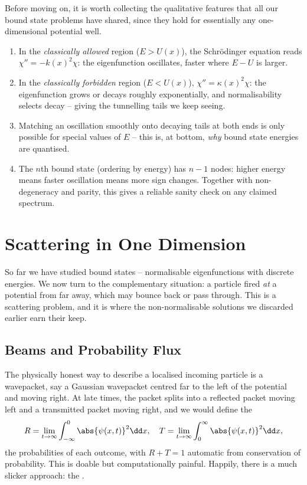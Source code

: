 Before moving on, it is worth collecting the qualitative features that all our bound state problems have shared, since they hold for essentially any one-dimensional potential well.
\begin{enumerate}[label=(\roman*)]
    \item In the \emph{classically allowed} region ($E > U(x)$), the Schr\"odinger equation reads $\chi'' = -k(x)^2 \chi$: the eigenfunction oscillates, faster where $E - U$ is larger.
    \item In the \emph{classically forbidden} region ($E < U(x)$), $\chi'' = \kappa(x)^2 \chi$: the eigenfunction grows or decays roughly exponentially, and normalisability selects decay -- giving the tunnelling tails we keep seeing.
    \item Matching an oscillation smoothly onto decaying tails at both ends is only possible for special values of $E$ -- this is, at bottom, \emph{why} bound state energies are quantised.
    \item The $n$th bound state (ordering by energy) has $n - 1$ nodes: higher energy means faster oscillation means more sign changes. Together with non-degeneracy and parity, this gives a reliable sanity check on any claimed spectrum.
\end{enumerate}

\section{Scattering in One Dimension}

So far we have studied bound states -- normalisable eigenfunctions with discrete energies. We now turn to the complementary situation: a particle fired \emph{at} a potential from far away, which may bounce back or pass through. This is a scattering problem, and it is where the non-normalisable solutions we discarded earlier earn their keep.

\subsection{Beams and Probability Flux}

The physically honest way to describe a localised incoming particle is a wavepacket, say a Gaussian wavepacket centred far to the left of the potential and moving right. At late times, the packet splits into a reflected packet moving left and a transmitted packet moving right, and we would define the 
$$
R = \lim_{t \to \infty} \int_{-\infty}^{0} \abs{\psi(x,t)}^2 \dd x, \quad T = \lim_{t \to \infty} \int_{0}^{\infty} \abs{\psi(x,t)}^2 \dd x,
$$
the probabilities of each outcome, with $R + T = 1$ automatic from conservation of probability. This is doable but computationally painful. Happily, there is a much slicker approach: the .

